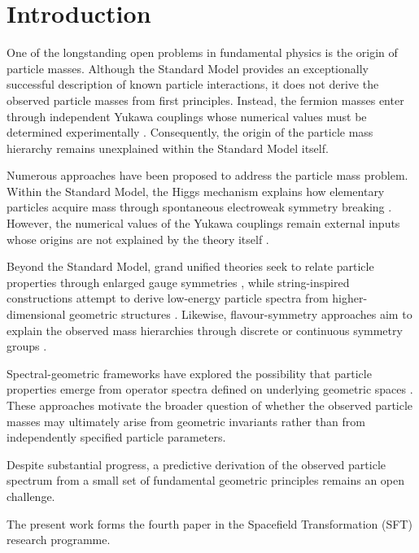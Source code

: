 \documentclass[11pt]{article}
\theoremstyle{definition}
\theoremstyle{remark}
\begin{document}

\section{Introduction}
\label{sec:introduction}

One of the longstanding open problems in fundamental physics is
the origin of particle masses. Although the Standard Model
provides an exceptionally successful description of known
particle interactions, it does not derive the observed particle
masses from first principles. Instead, the fermion masses enter
through independent Yukawa couplings whose numerical values must
be determined experimentally \cite{Weinberg1995,Peskin1995}.
Consequently, the origin of the particle mass hierarchy remains
unexplained within the Standard Model itself.

Numerous approaches have been proposed to address the particle
mass problem. Within the Standard Model, the Higgs mechanism
explains how elementary particles acquire mass through
spontaneous electroweak symmetry breaking
\cite{Higgs1964,Englert1964}. However, the numerical values of
the Yukawa couplings remain external inputs whose origins are
not explained by the theory itself
\cite{Weinberg1995,Peskin1995}.

Beyond the Standard Model, grand unified theories seek to
relate particle properties through enlarged gauge symmetries
\cite{Georgi1974}, while string-inspired constructions attempt
to derive low-energy particle spectra from higher-dimensional
geometric structures \cite{Green1987}. Likewise,
flavour-symmetry approaches aim to explain the observed mass
hierarchies through discrete or continuous symmetry groups
\cite{King2013}.

Spectral-geometric frameworks have explored the possibility
that particle properties emerge from operator spectra defined
on underlying geometric spaces \cite{Connes1994}. These
approaches motivate the broader question of whether the
observed particle masses may ultimately arise from geometric
invariants rather than from independently specified particle
parameters.

Despite substantial progress, a predictive derivation of the
observed particle spectrum from a small set of fundamental
geometric principles remains an open challenge.

The present work forms the fourth paper in the Spacefield
Transformation (SFT) research programme.
\end{document}
